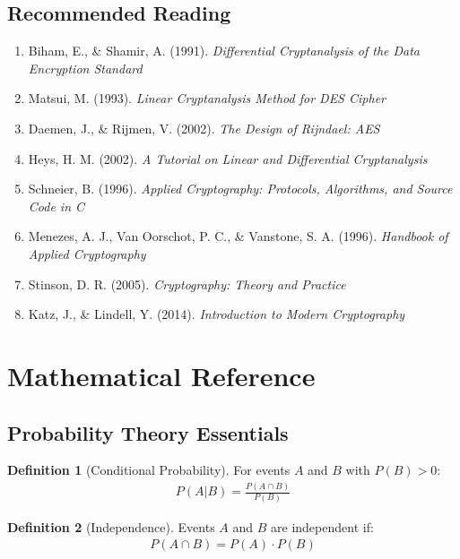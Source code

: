 \documentclass[12pt,a4paper]{article}
\theoremstyle{definition}
\newtheorem{definition}{Definition}[section]
\begin{document}
\subsection{Recommended Reading}

\begin{enumerate}
    \item Biham, E., \& Shamir, A. (1991). \textit{Differential Cryptanalysis of the Data Encryption Standard} \cite{biham1991differential}
    \item Matsui, M. (1993). \textit{Linear Cryptanalysis Method for DES Cipher} \cite{matsui1993linear}
    \item Daemen, J., \& Rijmen, V. (2002). \textit{The Design of Rijndael: AES} \cite{daemen2002design}
    \item Heys, H. M. (2002). \textit{A Tutorial on Linear and Differential Cryptanalysis} \cite{heys2002tutorial}
    \item Schneier, B. (1996). \textit{Applied Cryptography: Protocols, Algorithms, and Source Code in C} \cite{schneier1996applied}
    \item Menezes, A. J., Van Oorschot, P. C., \& Vanstone, S. A. (1996). \textit{Handbook of Applied Cryptography} \cite{menezes1996handbook}
    \item Stinson, D. R. (2005). \textit{Cryptography: Theory and Practice} \cite{stinson2005cryptography}
    \item Katz, J., \& Lindell, Y. (2014). \textit{Introduction to Modern Cryptography} \cite{katz2014introduction}
\end{enumerate}

\appendix

\section{Mathematical Reference}

\subsection{Probability Theory Essentials}

\begin{definition}[Conditional Probability]
For events $A$ and $B$ with $P(B) > 0$:
\begin{align}
P(A|B) = \frac{P(A \cap B)}{P(B)}
\end{align}
\end{definition}

\begin{definition}[Independence]
Events $A$ and $B$ are independent if:
\begin{align}
P(A \cap B) = P(A) \cdot P(B)
\end{align}
\end{definition}
\end{document}

